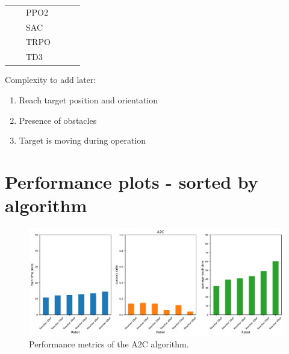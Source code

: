 \documentclass{article}
\begin{document}
\begin{longtable}{llllll}
                                                                                &                                                                          & PPO2         &                          &                       &                            \\
                                                                                &                                                                          & SAC          &                          &                       &                            \\
                                                                                &                                                                          & TRPO         &                          &                       &                            \\
                                                                                &                                                                          & TD3          &                          &                       &                         \\  
\hline
\end{longtable}






Complexity to add later:
\begin{enumerate}
  \item Reach target position and orientation
  \item Presence of obstacles
  \item Target is moving during operation
\end{enumerate}

\section{Performance plots - sorted by algorithm}


\begin{figure}[H]
    \centering
    \includegraphics[width=\textwidth]{../A2C.pdf}
\caption{Performance metrics of the A2C algorithm.}
\end{figure}
\end{document}
